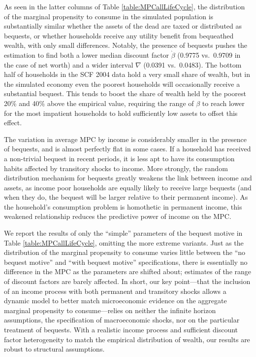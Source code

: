 \documentclass{econtex}\usepackage[pdftex]{graphicx}\usepackage{epstopdf} \usepackage[pdftex]{hyperref}
\newcommand{\Discount}{\ensuremath{\beta}}
\begin{document}
As seen in the latter columns of Table \ref{table:MPCallLifeCycle}, the distribution of the marginal propensity to consume in the simulated population is substantially similar whether the assets of the dead are taxed or distributed as bequests, or whether households receive any utility benefit from bequeathed wealth, with only small differences.  Notably, the presence of bequests pushes the estimation to find both a lower median discount factor $\grave{\Discount}$ (0.9775 vs.\ 0.9709 in the case of net worth) and a wider interval $\nabla$ (0.0391 vs.\ 0.0483).  The bottom half of households in the SCF 2004 data hold a very small share of wealth, but in the simulated economy even the poorest households will occasionally receive a substantial bequest.  This tends to boost the share of wealth held by the poorest 20\% and 40\% above the empirical value, requiring the range of $\Discount$ to reach lower for the most impatient households to hold sufficiently low assets to offset this effect.

The variation in average MPC by income is considerably smaller in the presence of bequests, and is almost perfectly flat in some cases.  If a household has received a non-trivial bequest in recent periods, it is less apt to have its consumption habits affected by transitory shocks to income.  More strongly, the random distribution mechanism for bequests greatly weakens the link between income and assets, as income poor households are equally likely to receive large bequests (and when they do, the bequest will be larger relative to their permanent income).  As the household's consumption problem is homothetic in permanent income, this weakened relationship reduces the predictive power of income on the MPC.

We report the results of only the ``simple'' parameters of the bequest motive in Table \ref{table:MPCallLifeCycle}, omitting the more extreme variants.  Just as the distribution of the marginal propensity to consume varies little between the ``no bequest motive'' and ``with bequest motive'' specifications, there is essentially no difference in the MPC as the parameters are shifted about; estimates of the range of discount factors are barely affected.  In short, our key point---that the inclusion of an income process with both permanent and transitory shocks allows a dynamic model to better match microeconomic evidence on the aggregate marginal propensity to consume---relies on neither the infinite horizon assumptions,%
the specification of macroeconomic shocks, nor on the particular treatment of bequests.  With a realistic income process and sufficient discount factor heterogeneity to match the empirical distribution of wealth, our results are robust to structural assumptions.
\end{document}

